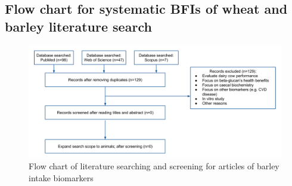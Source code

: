 \subsection{Flow chart for systematic BFIs of wheat and barley literature search}
\begin{figure}[h]
	\centering
	\includegraphics[width=\linewidth]{picture/barley_biomarker_review}
	\caption{Flow chart of literature searching and screening for articles of barley intake biomarkers}
	\label{fig:barleybiomarkerreview}
\end{figure}